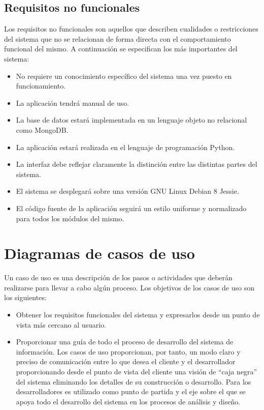 \subsection{Requisitos no funcionales}

Los requisitos no funcionales son aquellos que describen cualidades o restricciones del sistema que no se relacionan de forma directa con el comportamiento funcional del mismo. A continuación se especifican los más importantes del sistema:
\begin{itemize}
\item No requiere un conocimiento específico del sistema una vez puesto en funcionamiento.
\item La aplicación tendrá manual de uso.
\item La base de datos estará implementada en un lenguaje objeto no relacional como MongoDB.
\item La aplicación estará realizada en el lenguaje de programación Python.
\item La interfaz debe reflejar claramente la distinción entre las distintas partes del sistema.
\item El sistema se desplegará sobre una versión GNU Linux Debian 8 Jessie.
\item El código fuente de la aplicación seguirá un estilo uniforme y normalizado para todos los módulos del mismo.
\end{itemize}


\section {Diagramas de casos de uso}

Un caso de uso es una descripción de los pasos o actividades que deberán realizarse para llevar a cabo algún proceso. Los objetivos de los casos de uso son los siguientes:

\begin{itemize}
\item Obtener los requisitos funcionales del sistema y expresarlos desde un punto de vista más cercano al usuario.
\item Proporcionar una guía de todo el proceso de desarrollo del sistema de información. Los casos de uso proporcionan, por tanto, un modo claro y preciso de comunicación entre lo que desea el cliente y el desarrollador proporcionando desde el punto de vista del cliente una visión de ``caja negra'' del sistema eliminando los detalles de su construcción o desarrollo. Para los desarrolladores es utilizado como punto de partida y el eje sobre el que se apoya todo el desarrollo del sistema en los procesos de análisis y diseño.
\end{itemize}

